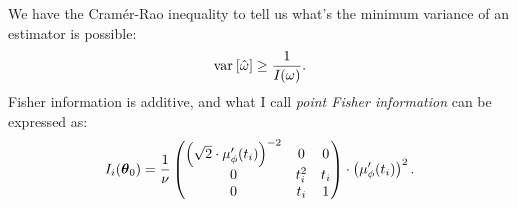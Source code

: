 \documentclass{article}
\begin{document}
We have the Cram\'er-Rao inequality to tell us what's the minimum variance of an estimator is possible:
\[
	\var{\hat{\omega}} \geq \frac{1}{\Fisher(\omega)}.
\]
Fisher information is additive, and what I call \emph{point Fisher information} can be expressed as:
\[
	\Fisher[i] = \frac{1}{\nu}\begin{pmatrix}
		\bkt{\sqrt{2}\cdot\mupp}^{-2} & 0     & 0   \\
		0                             & t_i^2 & t_i \\
		0                             & t_i   & 1
	\end{pmatrix}\cdot \bkt{\mupp}^2.
\]

\begin{wrapfigure}{l}{.25\textwidth}
\end{wrapfigure}
\end{document}
